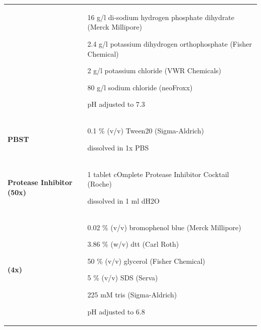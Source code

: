 \begin{longtable}{|Y{3.9cm}|m{10.7cm}|}
\textbf{} & \vspace{2mm}
            16 g/l  di-sodium hydrogen phosphate dihydrate   (Merck Millipore)    \par \vspace{2mm}
            2.4 g/l potassium dihydrogen orthophosphate   (Fisher Chemical)      \par \vspace{2mm}
            2 g/l   potassium chloride   (VWR Chemicals)                           \par \vspace{2mm}
            80 g/l  sodium chloride   (neoFroxx)                                  \par \vspace{2mm}
            pH adjusted to 7.3 \vspace{2mm} \\ 

\textbf{\Gls{PBST}} &\vspace{2mm}
                0.1 \% (v/v) Tween20   (Sigma-Aldrich)              \par \vspace{2mm}
                dissolved in 1x \gls{PBS}                            \vspace{2mm} \\ 

\textbf{Protease Inhibitor (50x)}    &\vspace{2mm}
                1 tablet cOmplete Protease Inhibitor Cocktail   (Roche)  \par \vspace{2mm}
                dissolved in 1 ml \gls{dH2O}                            \vspace{2mm} \\

\textbf{ (4x)} & \vspace{2mm} 
            0.02 \% (v/v)    bromophenol blue	  (Merck Millipore) \par \vspace{2mm}
            3.86 \% (w/v)	\gls{dtt}	          (Carl Roth)        \par \vspace{2mm}
            50 \% (v/v)	    glycerol         	  (Fisher Chemical) \par \vspace{2mm}
            5 \% (v/v)	    \gls{SDS}             (Serva)              \par \vspace{2mm}
            225 mM          \gls{tris}            (Sigma-Aldrich)        \par \vspace{2mm}
            pH adjusted to 6.8 \vspace{2mm} \\


\end{longtable}
